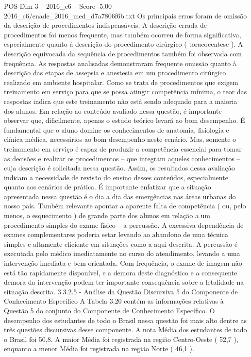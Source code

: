 \begin{textsample}{POS Dim 3 – 2016\_c6 – Score -5.00 – 2016\_c6/enade\_2016\_med\_d7a7806f6b.txt}
Os principais erros foram de omissão da descrição de procedimentos indispensáveis.
A descrição errada de procedimentos foi menos frequente, mas também ocorreu de forma significativa, especialmente quanto à descrição do procedimento cirúrgico ( toracocentese ).
A descrição equivocada da sequência de procedimentos também foi observada com frequência.
As respostas analisadas demonstraram frequente omissão quanto à descrição das etapas de assepsia e anestesia em um procedimento cirúrgico realizado em ambiente hospitalar.
Como se trata de procedimentos que exigem treinamento em serviço para que se possa atingir competência mínima, o teor das respostas indica que este treinamento não está sendo adequado para a maioria dos alunos.
Em relação ao conteúdo avaliado nessa questão, é importante observar que, dificilmente, apenas o estudo teórico levará ao bom desempenho.
É fundamental que o aluno domine os conhecimentos de anatomia, fisiologia e clínica médica, necessários ao bom desempenho neste cenário.
Mas, somente o treinamento em serviço é capaz de produzir a competência essencial para tomar as decisões e realizar os procedimentos – que integram aqueles conhecimentos – cuja descrição é solicitada nessa questão.
Assim, os resultados dessa avaliação indicam a necessidade de revisão do ensino desses conteúdos, especialmente quanto aos cenários de prática.
É importante enfatizar que a situação apresentada nessa questão é o dia a dia das emergências nas áreas urbanas do nosso país.
Também relevante apontar a aparente falta de competência ( ou, pelo menos, o esquecimento ) de grande parte dos alunos em relação a um procedimento simples do exame físico – a percussão.
A excessiva dependência de exames complementares poderia estar levando ao abandono de uma técnica simples e altamente eficiente em situações como a aqui descrita.
A percussão é executada pelo médico imediatamente no curso do atendimento, levando a uma intervenção imediata e bem orientada.
Com frequência, o exame de imagem não está tão rapidamente disponível, e a demora deste diagnóstico e a consequente demora da intervenção podem ter importante consequência sobre a letalidade na situação descrita. 3.3.2.5 - Análise da Questão Discursiva 5 do Componente de Conhecimento Específico A Tabela 3.20 contém as informações relativas à Questão 5 do conjunto do Componente de Conhecimento Específico.
O desempenho dos estudantes de todo o Brasil nessa questão foi mais alto dentre as três questões discursivas desse componente.
A nota Média dos estudantes de todo o Brasil foi 50,8.
A maior Média foi registrada na região Centro-Oeste ( 52,7 ), enquanto a menor Média foi registrada na região Norte ( 46,1 ).

\end{textsample}
